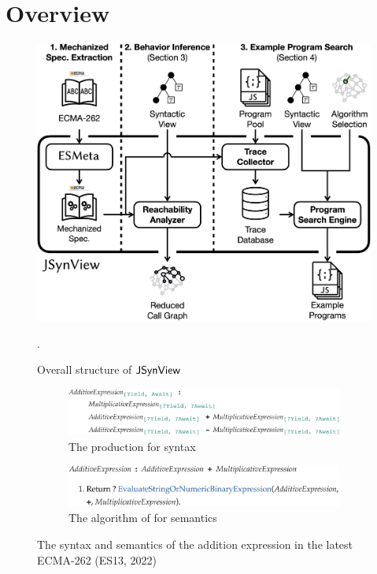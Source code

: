\section{Overview}\label{sec:overview}

\begin{figure}
  \centering
  \includegraphics[width=\columnwidth]{img/overall.png}
  \caption{Overall structure of $\tool$}
  \label{fig:overall}.
\end{figure}

\begin{figure}
  \centering
  \begin{subfigure}[t]{\columnwidth}
    \centering
    \includegraphics[width=\columnwidth]{img/add-eval-bnf.png}
    \caption{The  production for syntax}
  \end{subfigure}
  \begin{subfigure}[t]{\columnwidth}
    \centering
    \includegraphics[width=\columnwidth]{img/add-eval-algo.png}
    \caption{The  algorithm of for semantics}
  \end{subfigure}
  \caption{The syntax and semantics of the addition expression in the latest
  ECMA-262 (ES13, 2022)}
  \label{fig:add-eval}
\end{figure}

